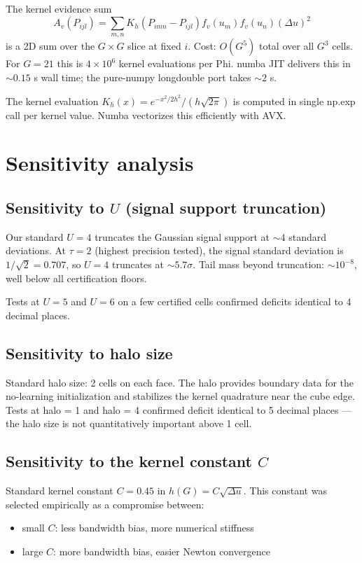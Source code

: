 \documentclass[11pt]{article}
\newcommand{\1}{\mathbf{1}}
\begin{document}
The kernel evidence sum
\begin{equation}
A_v(P_{ijl}) = \sum_{m, n} K_h(P_{imn} - P_{ijl}) f_v(u_m) f_v(u_n) (\Delta u)^2
\end{equation}
is a 2D sum over the $G \times G$ slice at fixed $i$.  Cost: $O(G^5)$
total over all $G^3$ cells.  For $G=21$ this is $4 \times 10^6$ kernel
evaluations per Phi.  numba JIT delivers this in $\sim 0.15$ s wall time;
the pure-numpy longdouble port takes $\sim 2$ s.

The kernel evaluation $K_h(x) = e^{-x^2/2h^2} / (h \sqrt{2\pi})$ is
computed in single np.exp call per kernel value.  Numba vectorizes this
efficiently with AVX.

\section{Sensitivity analysis}

\subsection{Sensitivity to $U$ (signal support truncation)}

Our standard $U = 4$ truncates the Gaussian signal support at
$\sim 4$ standard deviations.  At $\tau = 2$ (highest precision tested),
the signal standard deviation is $1/\sqrt 2 = 0.707$, so $U = 4$
truncates at $\sim 5.7 \sigma$.  Tail mass beyond truncation: $\sim 10^{-8}$,
well below all certification floors.

Tests at $U = 5$ and $U = 6$ on a few certified cells confirmed
deficits identical to 4 decimal places.

\subsection{Sensitivity to halo size}

Standard halo size: 2 cells on each face.  The halo provides boundary
data for the no-learning initialization and stabilizes the kernel
quadrature near the cube edge.  Tests at halo = 1 and halo = 4
confirmed deficit identical to 5 decimal places — the halo size is not
quantitatively important above 1 cell.

\subsection{Sensitivity to the kernel constant $C$}

Standard kernel constant $C = 0.45$ in $h(G) = C \sqrt{\Delta u}$.  This
constant was selected empirically as a compromise between:
\begin{itemize}
\item small $C$: less bandwidth bias, more numerical stiffness
\item large $C$: more bandwidth bias, easier Newton convergence
\end{itemize}
\end{document}
